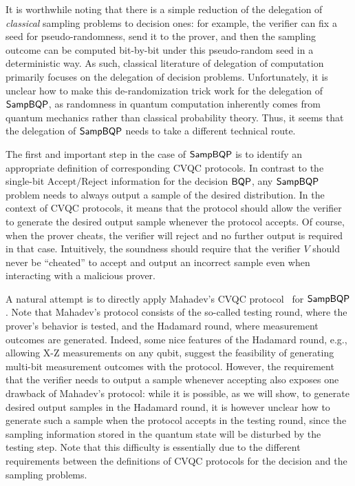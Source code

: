 It is worthwhile noting that there is a simple reduction of the delegation of \emph{classical} sampling problems to decision ones: for example, the verifier can fix a seed for pseudo-randomness, send it to the prover, and then the sampling outcome can be computed  bit-by-bit under this pseudo-random seed in a deterministic way. As such, classical literature of delegation of computation primarily focuses on the delegation of decision problems. 
Unfortunately, it is unclear how to make this de-randomization trick work for the delegation of $\operatorname{\mathsf{SampBQP}}$, 
as randomness in quantum computation inherently comes from quantum mechanics rather than classical probability theory. 
Thus, it seems that the delegation of $\operatorname{\mathsf{SampBQP}}$ needs to take a different technical route.

The first and important step in the case of $\operatorname{\mathsf{SampBQP}}$ is to identify an appropriate definition of corresponding CVQC protocols. In contrast to the single-bit $\mathrm{Accept/Reject}$ information for the decision $\operatorname{\mathsf{BQP}}$, any $\operatorname{\mathsf{SampBQP}}$ problem needs to always output a sample of the desired distribution.
In the context of CVQC protocols, it means that the protocol should allow the verifier to generate the desired output sample whenever the protocol accepts. Of course, when the prover cheats, the verifier will reject and no further output is required in that case.  
Intuitively, the soundness should require that the verifier $V$ should never be ``cheated'' to accept and output an incorrect sample even when interacting with a malicious prover. 

A natural attempt is to directly apply Mahadev's CVQC protocol~\cite{FOCS:Mahadev18a} for $\operatorname{\mathsf{SampBQP}}$.  Note that Mahadev's protocol consists of the so-called testing round, where the prover's behavior is tested,  and the Hadamard round, where measurement outcomes are generated. 
Indeed, some nice features of the Hadamard round,  e.g., allowing X-Z measurements on any qubit,  suggest the feasibility of generating  multi-bit measurement outcomes with the protocol. 
However, the requirement that the verifier needs to output a sample whenever accepting also exposes one drawback of Mahadev's protocol: while it is possible, as we will show, to generate desired output samples in the Hadamard round, 
it is however unclear how to generate such a sample when the protocol accepts in the testing round, since the sampling information stored in the quantum state will be disturbed by the testing step. 
Note that this difficulty is essentially due to the different requirements between the definitions of CVQC protocols for the decision and the sampling problems. 

